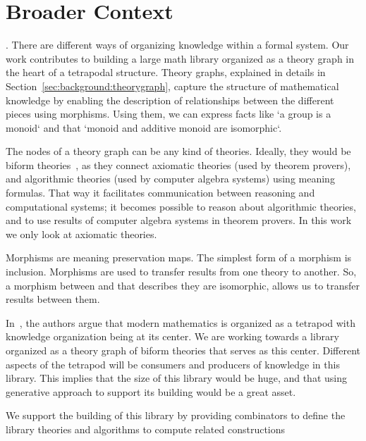 \section{Broader Context}. 
\label{sec:broader_context}
There are different ways of organizing knowledge within a formal system. Our work contributes to building a large math library organized as a theory graph in the heart of a tetrapodal structure. Theory graphs, explained in details in Section~\ref{sec:background:theorygraph}, capture the structure of mathematical knowledge by enabling the description of relationships between the different pieces using morphisms. Using them, we can express facts like `a group is a monoid` and that `monoid and additive monoid are isomorphic`. 

The nodes of a theory graph can be any kind of theories. Ideally, they would be biform theories~\cite{biformCICM2018}, as they connect axiomatic theories (used by theorem provers), and algorithmic theories (used by computer algebra systems) using meaning formulas. That way it facilitates communication between reasoning and computational systems; it becomes possible to reason about algorithmic theories, and to use results of computer algebra systems in theorem provers. In this work we only look at axiomatic theories. 

Morphisms are meaning preservation maps. The simplest form of a morphism is inclusion. Morphisms are used to transfer results from one theory to another. So, a morphism between  and  that describes they are isomorphic, allows us to transfer results between them. 

In~\cite{carette2020bigMath}, the authors argue that modern mathematics is organized as a tetrapod with knowledge organization being at its center. We are working towards a library organized as a theory graph of biform theories that serves as this center. Different aspects of the tetrapod will be consumers and producers of knowledge in this library. This implies that the size of this library would be huge, and that using generative approach to support its building would be a great asset. 

We support the building of this library by providing combinators to define the library theories and algorithms to compute related constructions

